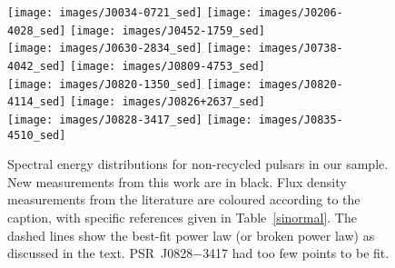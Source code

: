 \documentclass{pasa}%
\begin{document}
\begin{figure*}
\texttt{[image: images/J0034-0721\_sed]}\hspace*{-0.5em}%
\hspace*{-0.5em}\texttt{[image: images/J0206-4028\_sed]}\hspace*{-0.5em}%
\hspace*{-0.5em}\texttt{[image: images/J0452-1759\_sed]}\\[-0.6em]
\texttt{[image: images/J0630-2834\_sed]}\hspace*{-0.5em}%
\hspace*{-0.5em}\texttt{[image: images/J0738-4042\_sed]}\hspace*{-0.5em}%
\hspace*{-0.5em}\texttt{[image: images/J0809-4753\_sed]}\\[-0.6em]
\texttt{[image: images/J0820-1350\_sed]}\hspace*{-0.5em}%
\hspace*{-0.5em}\texttt{[image: images/J0820-4114\_sed]}\hspace*{-0.5em}%
\hspace*{-0.5em}\texttt{[image: images/J0826+2637\_sed]}\\[-0.6em]
\texttt{[image: images/J0828-3417\_sed]}\hspace*{-0.5em}%
\hspace*{-0.5em}\texttt{[image: images/J0835-4510\_sed]}\hspace*{-0.5em}%
\\
\caption{Spectral energy distributions for non-recycled pulsars in our sample. New measurements from this work are in black.
Flux density measurements from the literature are coloured according to the caption, with specific references given in
Table~\ref{sinormal}. The dashed lines show the best-fit power law (or broken power law) as discussed in the text. PSR~J0828$-$3417 had too few points to be fit.}
\label{seds1}
\end{figure*}
\end{document}
